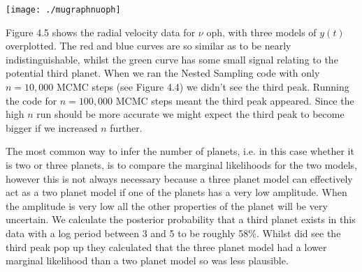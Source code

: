 \noindent
\begin{minipage}{\linewidth}%
\centering
\texttt{[image: ./mugraphnuoph]}
\label{fig:munuoph}
\end{minipage}

Figure 4.5 shows the radial velocity data for $\nu$ oph, with three models of $y(t)$ overplotted. The red and blue curves are so similar as to be nearly indistinguishable, whilst the green curve has some small signal relating to the potential third planet. When we ran the Nested Sampling code with only $n = 10,000$ MCMC steps (see Figure 4.4) we didn't see the third peak. Running the code for $n = 100,000$ MCMC steps meant the third peak appeared. Since the high $n$ run should be more accurate we might expect the third peak to become bigger if we increased $n$ further. 

The most common way to infer the number of planets, i.e. in this case whether it is two or three planets, is to compare the marginal likelihoods for the two models, however this is not always necessary because a three planet model can effectively act as a two planet model if one of the planets has a very low amplitude. When the amplitude is very low all the other properties of the planet will be very uncertain. We calculate the posterior probability that a third planet exists in this data with a log period between 3 and 5 to be roughly 58\%. Whilst \cite{2014arXiv1401.6128H} did see the third peak pop up they calculated that the three planet model had a lower marginal likelihood than a two planet model so was less plausible.




